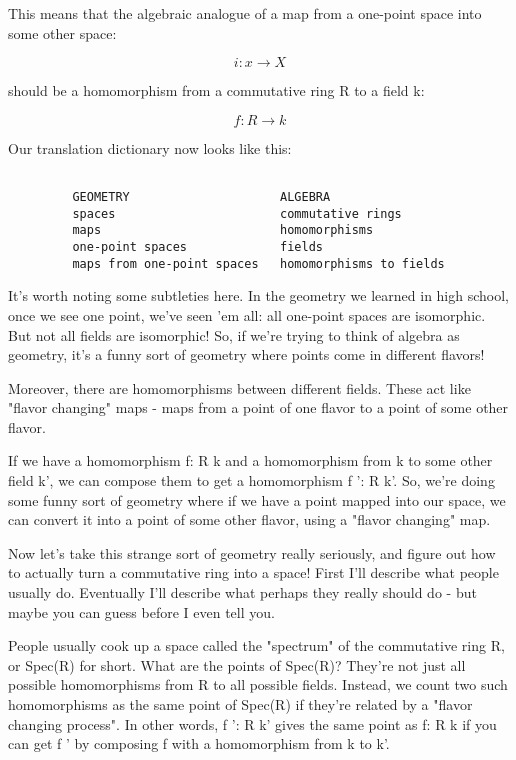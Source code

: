 This means that the algebraic analogue of a map from a one-point
space into some other space:


$$

i: {x} \to  X
$$
    
should be a homomorphism from a commutative ring R to a field k:


$$

f: R \to  k
$$
    

Our translation dictionary now looks like this:


\begin{verbatim}

         GEOMETRY                     ALGEBRA
         spaces                       commutative rings
         maps                         homomorphisms
         one-point spaces             fields
         maps from one-point spaces   homomorphisms to fields
\end{verbatim}
    
It's worth noting some subtleties here.  In the geometry we learned in 
high school, once we see one point, we've seen 'em all: all one-point 
spaces are isomorphic.  But not all fields are isomorphic!  So, if 
we're trying to think of algebra as geometry, it's a funny sort of 
geometry where points come in different flavors!  

Moreover, there are homomorphisms between different fields.  These
act like "flavor changing" maps - maps from a point of one flavor
to a point of some other flavor.

If we have a homomorphism f: R \to  k and a homomorphism from k to some 
other field k', we can compose them to get a homomorphism f ': R \to  k'.  
So, we're doing some funny sort of geometry where if we have a point 
mapped into our space, we can convert it into a point of some other 
flavor, using a "flavor changing" map.  

Now let's take this strange sort of geometry really seriously, and
figure out how to actually turn a commutative ring into a space! 
First I'll describe what people usually do.  Eventually I'll describe
what perhaps they really should do - but maybe you can guess before 
I even tell you.  

People usually cook up a space called the "spectrum" of the 
commutative
ring R, or Spec(R) for short.  What are the points of Spec(R)?
They're not just all possible homomorphisms from R to all possible 
fields.  Instead, we count two such homomorphisms as the same 
point of Spec(R) if they're related by a "flavor changing process".  
In other words, f ': R \to  k' gives the same point as f: R \to  k if you 
can get f ' by composing f with a homomorphism from k to k'.  

